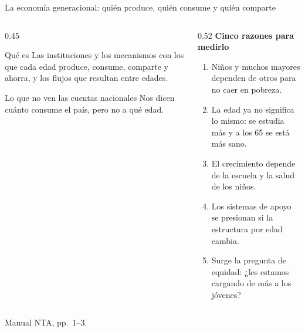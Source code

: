 \documentclass[aspectratio=169,11pt]{beamer}
\newcommand{\fuente}[1]{\par\vfill{\small\color{cGris}#1\par}}
\begin{document}
\begin{frame}{La economía generacional: quién produce, quién consume y quién comparte}
  \begin{columns}[T]
    \begin{column}{0.45\textwidth}
      \begin{block}{Qué es}
        Las instituciones y los mecanismos con los que cada edad produce, consume, comparte y ahorra, y los flujos que resultan entre edades.
      \end{block}
      \pause
      \begin{alertblock}{Lo que no ven las cuentas nacionales}
        Nos dicen cuánto consume el país, pero no a qué edad.
      \end{alertblock}
    \end{column}
    \begin{column}{0.52\textwidth}
      \pause
      \textbf{Cinco razones para medirlo}
      \begin{enumerate}
        \item Niños y muchos mayores dependen de otros para no caer en pobreza.
        \item La edad ya no significa lo mismo: se estudia más y a los 65 se está más sano.
        \item El crecimiento depende de la escuela y la salud de los niños.
        \item Los sistemas de apoyo se presionan si la estructura por edad cambia.
        \item Surge la pregunta de equidad: ¿les estamos cargando de más a los jóvenes?
      \end{enumerate}
    \end{column}
  \end{columns}
  \fuente{Manual NTA, pp.~1--3.}
\end{frame}
\end{document}
